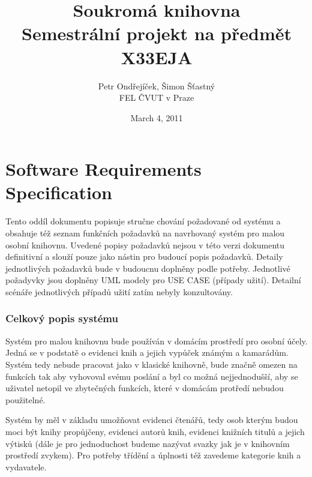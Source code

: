 \documentclass{article}
\title{Soukromá knihovna\\
 Semestrální projekt na předmět X33EJA}
\date{March 4, 2011}
\author{Petr Ondřejíček, Šimon Šťastný\\
FEL ČVUT v Praze}
\begin{document}
\begin{titlepage}
  \maketitle
  \thispagestyle{empty}
\end{titlepage}


\newpage

\part{Software Requirements Specification}

\vspace{10mm}
\smallskip

\indent \par Tento oddíl dokumentu popisuje stručne chování požadované od
systému a obsahuje též seznam funkčních požadavků na navrhovaný systém pro malou
osobní knihovnu. Uvedené popisy požadavků nejsou v této verzi dokumentu
definitivní a slouží pouze jako nástin pro budoucí popis požadavků. Detaily
jednotlivých požadavků bude v budoucnu doplněny podle potřeby. Jednotlivé
požadyvky jsou doplněny UML modely pro USE CASE (případy užití). Detailní
scénáře jednotlivých případů užití zatím nebyly konzultovány.


\newpage

\section{Celkový popis systému}
\indent \par Systém pro malou knihovnu bude používán v domácím prostředí pro
osobní účely. Jedná se v podstatě o evidenci knih a jejich vypůček známým a
kamarádům. Systém tedy nebude pracovat jako v klasické knihovně, bude značně
omezen na funkcích tak aby vyhovoval svému poslání a byl co možná
nejjednodušší, aby se uživatel netopil ve zbytečných funkcích, které v domácám
protředí nebudou použitelné.

\bigskip

Systém by měl v základu umožňovat evidenci čtenářů, tedy osob kterým budou moci
být knihy propůjčeny, evidenci autorů knih, evidenci knižních titulů a jejich
výtisků (dále je pro jednoduchost budeme nazývat svazky jak je v knihovním
prostředí zvykem). Pro potřeby třídění a úplnosti též zavedeme kategorie knih a
vydavatele.

\bigskip
\end{document}
